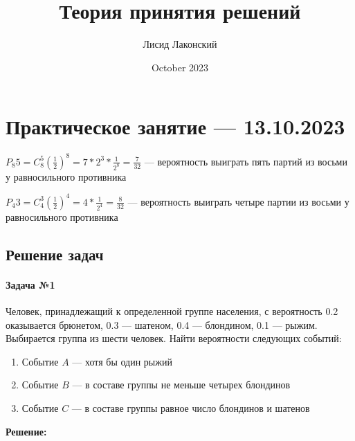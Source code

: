 \documentclass{article}
\title{Теория принятия решений}
\author{Лисид Лаконский}
\date{October 2023}
\begin{document}
\raggedright

\maketitle

\tableofcontents
\pagebreak

\section{Практическое занятие — 13.10.2023}

$P_{8}{5} = C_{8}^{5} (\frac{1}{2})^8 = 7 * 2^3 * \frac{1}{2^{8}} = \frac{7}{32}$ — вероятность выиграть пять партий из восьми у равносильного противника

$P_{4}{3} = C_{4}^{3} (\frac{1}{2})^4 = 4 * \frac{1}{2^{4}} = \frac{8}{32}$ — вероятность выиграть четыре партии из восьми у равносильного противника

\subsection{Решение задач}

\paragraph{Задача №1}

Человек, принадлежащий к определенной группе населения, с вероятность 0.2 оказывается брюнетом, 0.3 — шатеном, 0.4 — блондином, 0.1 — рыжим. Выбирается группа из шести человек. Найти вероятности следующих событий:

\begin{enumerate}
    \item Событие $A$ — хотя бы один рыжий
    \item Событие $B$ — в составе группы не меньше четырех блондинов
    \item Событие $C$ — в составе группы равное число блондинов и шатенов
\end{enumerate}

\textbf{Решение:}
\end{document}
